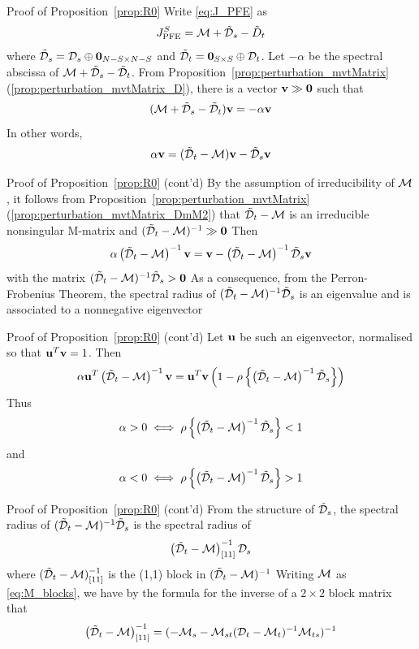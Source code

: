 \documentclass[aspectratio=169]{beamer}
\begin{document}
\begin{frame}{Proof of Proposition~\ref{prop:R0}}
		Write \eqref{eq:J_PFE} as
		\[
		J_{\textrm{PFE}}^S=\mathcal{M}+\tilde{\mathcal{D}}_s-\tilde D_t
		\]
		where $\tilde\D_s=\D_s\oplus\b0_{N-S\times N-S}$ and $\tilde \D_t=\b0_{S\times S}\oplus\D_t$.
		Let $-\alpha$ be the spectral abscissa of $\mathcal{M}+\tilde{\mathcal{D}}_s-\tilde{\mathcal{D}}_t$. 
		From Proposition~\ref{prop:perturbation_mvtMatrix}(\ref{prop:perturbation_mvtMatrix_D}), there is a vector $\bv\gg \b0$ such that
		\[
		(\mathcal{M}+\tilde{\mathcal{D}}_s-\tilde{\mathcal{D}}_t)\mathbf{v} = -\alpha\mathbf{v}
		\]
		In other words,
		\[
		\alpha\mathbf{v} = (\tilde{\mathcal{D}}_t-\mathcal{M})\mathbf{v}-\tilde{\mathcal{D}}_s\mathbf{v}
		\]
\end{frame}


\begin{frame}{Proof of Proposition~\ref{prop:R0} (cont'd)}
		By the assumption of irreducibility of $\mathcal{M}$, it follows from Proposition~\ref{prop:perturbation_mvtMatrix}(\ref{prop:perturbation_mvtMatrix_DmM2}) that $\tilde{\mathcal{D}}_t-\mathcal{M}$ is an irreducible nonsingular M-matrix and $(\tilde\D_t-\M)^{-1}\gg\b0$
		\vfill
		Then
		\[
		\alpha\left(
		\tilde{\mathcal{D}}_t-\mathcal{M}
		\right)^{-1}\mathbf{v}
		=\mathbf{v} -\left(
		\tilde{\mathcal{D}}_t-\mathcal{M}
		\right)^{-1}
		\tilde{\mathcal{D}}_s\mathbf{v}
		\]
		with the matrix $(\tilde\D_t-\M)^{-1}\tilde\D_s>\b0$
		\vfill
		As a consequence, from the Perron-Frobenius Theorem, the spectral radius of $(\tilde{\mathcal{D}}_t-\mathcal{M})^{-1}\tilde{\mathcal{D}}_s$ is an eigenvalue and is associated to a nonnegative eigenvector
\end{frame}
		
\begin{frame}{Proof of Proposition~\ref{prop:R0} (cont'd)}
		Let $\mathbf{u}$ be such an eigenvector, normalised so that $\mathbf{u}^T\mathbf{v}=1$.
		Then
		\[
		\alpha\mathbf{u}^T
		\left(\tilde{\mathcal{D}}_t-\mathcal{M}\right)^{-1}\mathbf{v} =
		\mathbf{u}^T\mathbf{v}
		\left(1-
		\rho\left\{\left(\tilde{\mathcal{D}}_t-\mathcal{M}\right)^{-1}\tilde{\mathcal{D}}_s\right\}
		\right)
		\]
		\vfill
		Thus
		\[
		\alpha>0 \iff \rho\left\{\left(\tilde{\mathcal{D}}_t-\mathcal{M}\right)^{-1}\tilde{\mathcal{D}}_s\right\} <1
		\]
		and
		\[
		\alpha<0 \iff \rho\left\{\left(\tilde{\mathcal{D}}_t-\mathcal{M}\right)^{-1}\tilde{\mathcal{D}}_s\right\} >1
		\]
\end{frame}

\begin{frame}{Proof of Proposition~\ref{prop:R0} (cont'd)}
		From the structure of $\tilde{\mathcal{D}}_s$, the spectral radius of $(\tilde{\mathcal{D}}_t-\mathcal{M})^{-1}\tilde{\mathcal{D}}_s$ is the spectral radius of 
		\[
		\left(\tilde{\mathcal{D}}_t-\mathcal{M}\right)^{-1}_{[11]}\mathcal{D}_s
		\]
		where $(\tilde{\mathcal{D}}_t-\mathcal{M})^{-1}_{[11]}$ is the (1,1) block in $(\tilde{\mathcal{D}}_t-\mathcal{M})^{-1}$
		\vfill
		Writing $\mathcal{M}$ as \eqref{eq:M_blocks}, we have by the formula for the inverse of a $2\times 2$ block matrix that 
		\[
		\left(\tilde{\mathcal{D}}_t-\mathcal{M}\right)^{-1}_{[11]}=(-\mathcal{M}_s-\mathcal{M}_{st}(\mathcal{D}_t-\mathcal{M}_t)^{-1}\mathcal{M}_{ts})^{-1}
		\]
\end{frame}
\end{document}
